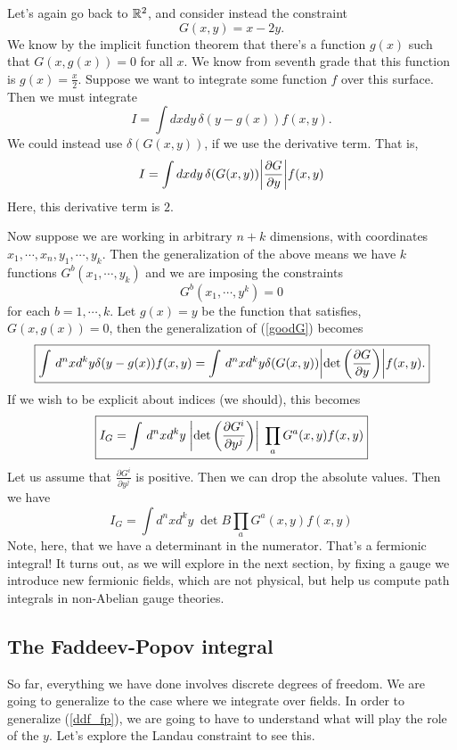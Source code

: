 \documentclass[main.tex]{subfiles}
\begin{document}
Let's again go back to $\mathbb{R}^2$, and consider instead the constraint
\[
G(x,y) = x - 2y.
\]
We know by the implicit function theorem that there's a function $g(x)$ such that $G(x,g(x)) = 0$ for all $x$. We know from seventh grade that this function is $g(x) = \frac{x}{2}$. Suppose we want to integrate some function $f$ over this surface. Then we must integrate
\[
I = \int dx dy \, \delta(y - g(x)) f(x,y).
\]
We could instead use $\delta(G(x,y))$, if we use the derivative term. That is,
\begin{equation}\label{goodG}
I = \int dx dy \, \delta( G(x,y) ) \abs{\frac{\partial G}{\partial y}} f(x,y)
\end{equation}
Here, this derivative term is $2$.

Now suppose we are working in arbitrary $n + k$ dimensions, with coordinates $x_1,\cdots,x_n,y_1,\cdots,y_k$. Then the generalization of the above means we have $k$ functions $G^b (x_1,\cdots,y_k)$ and we are imposing the constraints
\[
G^b (x_1,\cdots,y^k) = 0
\]
for each $b = 1,\cdots,k$. Let $g(x) = y$ be the function that satisfies, $G(x,g(x)) = 0$, then the generalization of (\ref{goodG}) becomes
\begin{equation}
\boxed{\int \, d^nx d^ky \delta(y - g(x)) f(x,y) = \int \, d^nx d^ky \delta(G(x,y)) \abs{\det \left(
\frac{\partial G}{\partial y}
\right)}f(x,y).}
\end{equation}
If we wish to be explicit about indices (we should), this becomes
\begin{equation} \label{ddf_fp}%
\boxed{I_G = \int \, d^n x d^k y \;\abs{\det \left( \frac{\partial G^i}{\partial y^j}\right)}\; \prod_a G^a (x,y) f(x,y)}
\end{equation}
Let us assume that $\frac{\partial G^i}{\partial y^j}$ is positive. Then we can drop the absolute values. Then we have 
\[
I_G = \int d^n x d^k y \; \det B \prod_a G^a (x,y) f(x,y)
\]
Note, here, that we have a determinant in the numerator. That's a fermionic integral! It turns out, as we will explore in the next section, by fixing a gauge we introduce new fermionic fields, which are not physical, but help us compute path integrals in non-Abelian gauge theories.
\subsection{The Faddeev-Popov integral}
So far, everything we have done involves discrete degrees of freedom. We are going to generalize to the case where we integrate over fields. In order to generalize (\ref{ddf_fp}), we are going to have to understand what will play the role of the $y$. Let's explore the Landau constraint to see this.
\end{document}
